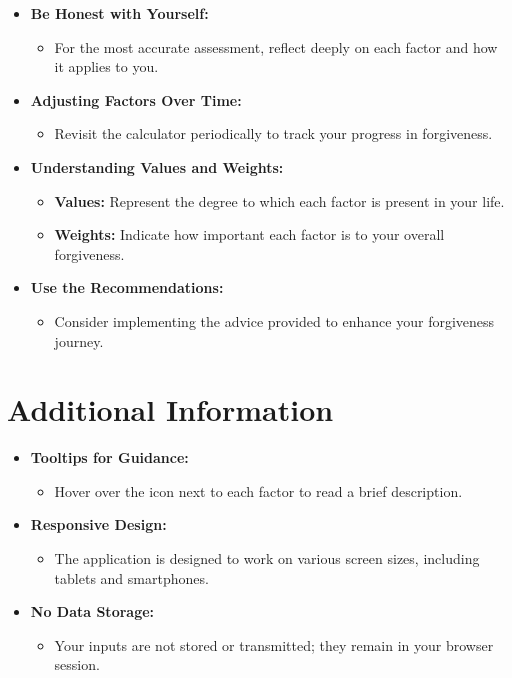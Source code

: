 \documentclass[11pt]{article}
\begin{document}
\begin{itemize}
    \item \textbf{Be Honest with Yourself:}
    \begin{itemize}
        \item For the most accurate assessment, reflect deeply on each factor and how it applies to you.
    \end{itemize}
    \item \textbf{Adjusting Factors Over Time:}
    \begin{itemize}
        \item Revisit the calculator periodically to track your progress in forgiveness.
    \end{itemize}
    \item \textbf{Understanding Values and Weights:}
    \begin{itemize}
        \item \textbf{Values:} Represent the degree to which each factor is present in your life.
        \item \textbf{Weights:} Indicate how important each factor is to your overall forgiveness.
    \end{itemize}
    \item \textbf{Use the Recommendations:}
    \begin{itemize}
        \item Consider implementing the advice provided to enhance your forgiveness journey.
    \end{itemize}
\end{itemize}

\section*{Additional Information}

\begin{itemize}
    \item \textbf{Tooltips for Guidance:}
    \begin{itemize}
        \item Hover over the \textbf{\Info} icon next to each factor to read a brief description.
    \end{itemize}
    \item \textbf{Responsive Design:}
    \begin{itemize}
        \item The application is designed to work on various screen sizes, including tablets and smartphones.
    \end{itemize}
    \item \textbf{No Data Storage:}
    \begin{itemize}
        \item Your inputs are not stored or transmitted; they remain in your browser session.
    \end{itemize}
\end{itemize}
\end{document}
